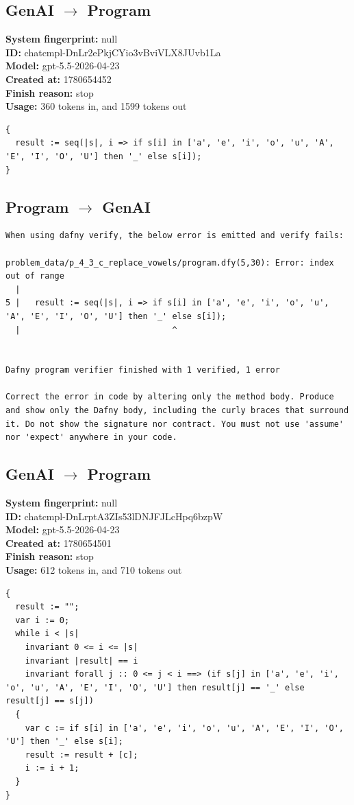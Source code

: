 \documentclass{article}
\begin{document}
\subsection*{GenAI $\rightarrow$ Program}
\textbf{System fingerprint: }null
\\\textbf{ID: }chatcmpl-DnLr2ePkjCYio3vBviVLX8JUvb1La
\\\textbf{Model: }gpt-5.5-2026-04-23
\\\textbf{Created at: }1780654452
\\\textbf{Finish reason: }stop
\\\textbf{Usage: }360 tokens in, and 1599 tokens out
\begin{lstlisting}
{
  result := seq(|s|, i => if s[i] in ['a', 'e', 'i', 'o', 'u', 'A', 'E', 'I', 'O', 'U'] then '_' else s[i]);
}
\end{lstlisting}
\subsection*{Program $\rightarrow$ GenAI}
\begin{lstlisting}
When using dafny verify, the below error is emitted and verify fails:

problem_data/p_4_3_c_replace_vowels/program.dfy(5,30): Error: index out of range
  |
5 |   result := seq(|s|, i => if s[i] in ['a', 'e', 'i', 'o', 'u', 'A', 'E', 'I', 'O', 'U'] then '_' else s[i]);
  |                               ^


Dafny program verifier finished with 1 verified, 1 error

Correct the error in code by altering only the method body. Produce and show only the Dafny body, including the curly braces that surround it. Do not show the signature nor contract. You must not use 'assume' nor 'expect' anywhere in your code.
\end{lstlisting}
\subsection*{GenAI $\rightarrow$ Program}
\textbf{System fingerprint: }null
\\\textbf{ID: }chatcmpl-DnLrptA3ZIs53lDNJFJLcHpq6bzpW
\\\textbf{Model: }gpt-5.5-2026-04-23
\\\textbf{Created at: }1780654501
\\\textbf{Finish reason: }stop
\\\textbf{Usage: }612 tokens in, and 710 tokens out
\begin{lstlisting}
{
  result := "";
  var i := 0;
  while i < |s|
    invariant 0 <= i <= |s|
    invariant |result| == i
    invariant forall j :: 0 <= j < i ==> (if s[j] in ['a', 'e', 'i', 'o', 'u', 'A', 'E', 'I', 'O', 'U'] then result[j] == '_' else result[j] == s[j])
  {
    var c := if s[i] in ['a', 'e', 'i', 'o', 'u', 'A', 'E', 'I', 'O', 'U'] then '_' else s[i];
    result := result + [c];
    i := i + 1;
  }
}
\end{lstlisting}
\end{document}
